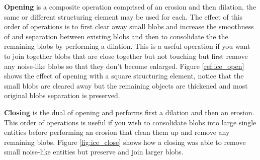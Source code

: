 \textbf{Opening} is a composite operation comprised of an erosion and then dilation, the same or different structuring element may be used for each. The effect of this order of operations is to first clear away small blobs and increase the smoothness of and separation between existing blobs and then to consolidate the the remaining blobs by performing a dilation. This is a useful operation if you want to join together blobs that are close together but not touching but first remove any noise-like blobs so that they don't become enlarged. Figure \ref{ref:ice_open} shows the effect of opening with a square structuring element, notice that the small blobs are cleared away but the remaining objects are thickened and most original blobs separation is preserved. 

\textbf{Closing} is the dual of opening and performs first a dilation and then an erosion. This order of operations is useful if you wish to consolidate blobs into large single entities before performing an erosion that clean them up and remove any remaining blobs. Figure \ref{fig:ice_close} shows how a closing was able to remove small noise-like entities but preserve and join larger blobs.

